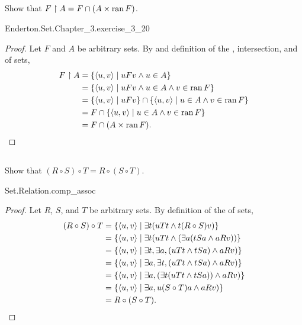 \documentclass{report}
\begin{document}
\subsection{}%

  Show that $F \restriction A = F \cap (A \times \mathop{\text{ran}}{F})$.

    {Enderton.Set.Chapter\_3.exercise\_3\_20}

  \begin{proof}
    Let $F$ and $A$ be arbitrary sets.
    By  and definition of the
      , intersection, and  of sets,
      \begin{align*}
        F \restriction A
          & = \{\left< u, v \right> \mid uFv \land u \in A\} \\
          & = \{\left< u, v \right> \mid
            uFv \land u \in A \land v \in \mathop{\text{ran}}{F}\} \\
          & = \{\left< u, v \right> \mid uFv\} \cap
            \{\left< u, v \right> \mid u \in A \land v \in \mathop{\text{ran}}{F}\} \\
          & = F \cap \{\left< u, v \right> \mid u \in A \land v \in \mathop{\text{ran}}{F}\} \\
          & = F \cap (A \times \mathop{\text{ran}}{F}).
      \end{align*}
  \end{proof}

\subsection{}%

  Show that $(R \circ S) \circ T = R \circ (S \circ T)$.

    {Set.Relation.comp\_assoc}

  \begin{proof}
    Let $R$, $S$, and $T$ be arbitrary sets.
    By definition of the  of sets,
      \begin{align*}
        (R \circ S) \circ T
          & = \{\left< u, v \right> \mid
            \exists t(uTt \land t(R \circ S)v)\} \\
          & = \{\left< u, v \right> \mid
            \exists t(uTt \land (\exists a(tSa \land aRv))\} \\
          & = \{\left< u, v \right> \mid
            \exists t, \exists a, (uTt \land tSa) \land aRv)\} \\
          & = \{\left< u, v \right> \mid
            \exists a, \exists t, (uTt \land tSa) \land aRv)\} \\
          & = \{\left< u, v \right> \mid
            \exists a, (\exists t(uTt \land tSa)) \land aRv)\} \\
          & = \{\left< u, v \right> \mid
            \exists a, u(S \circ T)a \land aRv)\} \\
          & = R \circ (S \circ T).
      \end{align*}
  \end{proof}
\end{document}
